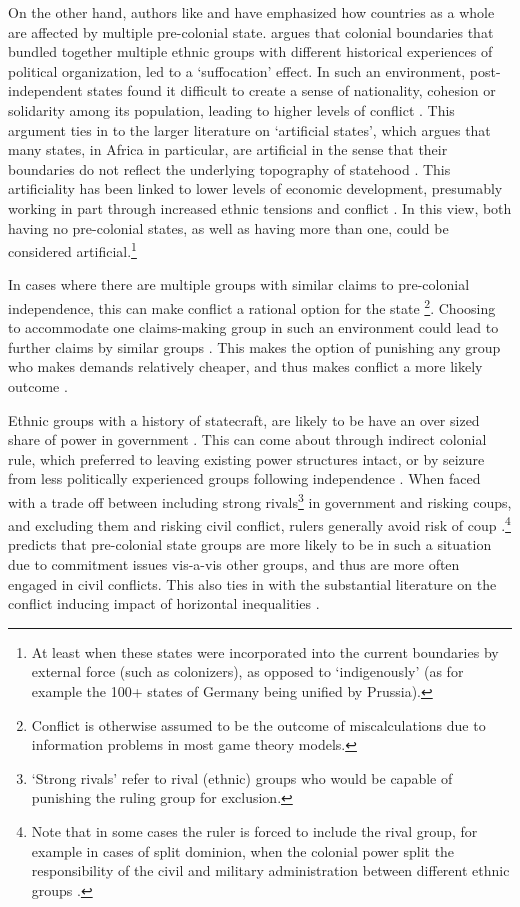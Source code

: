 \documentclass[12pt]{article}
\begin{document}
On the other hand, authors like \citet{Englebert2002} and \citet{Alesina2011}
have emphasized how countries as a whole are affected by multiple pre-colonial
state. \citet{Englebert2002} argues that colonial boundaries that bundled
together multiple ethnic groups with different historical experiences of
political organization, led to a `suffocation' effect. In such an environment,
post-independent states found it difficult to create a sense of nationality,
cohesion or solidarity among its population, leading to higher levels of
conflict \citep{Englebert2002}. This argument ties in to the larger literature
on `artificial states', which argues that many states, in Africa in particular,
are artificial in the sense that their boundaries do not reflect the underlying
topography of statehood \citep{Alesina2011}. This artificiality has been linked
to lower levels of economic development, presumably working in part through
increased ethnic tensions and conflict \citep{Alesina2011}. In this view, both
having no pre-colonial states, as well as having more than one, could be
considered artificial.\footnote{At least when these states were incorporated
	into the current boundaries by external force (such as colonizers), as
opposed to `indigenously' (as for example the 100+ states of Germany being
unified by Prussia).} 

In cases where there are multiple groups with similar claims to pre-colonial
independence, this can make conflict a rational option for the state
\footnote{Conflict is otherwise assumed to be the outcome of miscalculations due
to information problems in most game theory models.}. Choosing to accommodate
one claims-making group in such an environment could lead to further claims by
similar groups \citep{Walter2009}. This makes the option of punishing any group
who makes demands relatively cheaper, and thus makes conflict a more likely
outcome \citep{Wishman}.

Ethnic groups with a history of statecraft, are likely to be have an over sized
share of power in government \citep{Wucherpfennig2016}. This can come about
through indirect colonial rule, which preferred to leaving existing power
structures intact, or by seizure from less politically experienced groups
following independence \citep{Paine2019}. When faced with a trade off between
including strong rivals\footnote{`Strong rivals' refer to rival (ethnic) groups
who would be capable of punishing the ruling group for exclusion.} in government
and risking coups, and excluding them and risking civil conflict, rulers
generally avoid risk of coup \citep{Paine2019, Powell_2014,
	Roessler_2011}.\footnote{Note that in some cases the ruler is forced to
include the rival group, for example in cases of split dominion, when the
colonial power split the responsibility of the civil and military administration
between different ethnic groups \citep{Paine2019}.} \citet{Paine2019} predicts
that pre-colonial state groups are more likely to be in such a situation due to
commitment issues vis-a-vis other groups, and thus are more often engaged in
civil conflicts. This also ties in with the substantial literature on the
conflict inducing impact of horizontal inequalities \citep{CEDERMAN_2011}.
\end{document}
